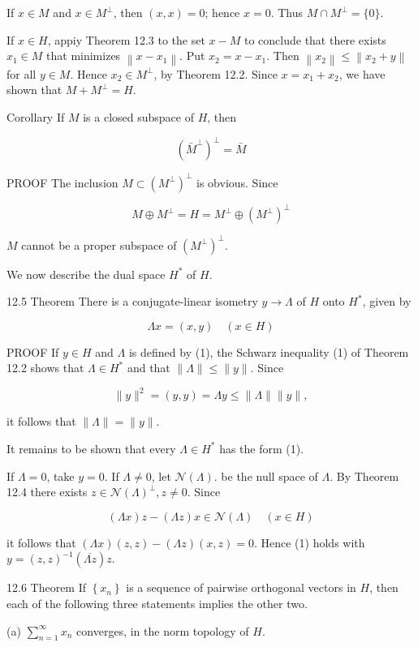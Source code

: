 \documentclass[10pt]{article}
\begin{document}
If $x \in M$ and $x \in M^{\perp}$, then $(x, x)=0$; hence $x=0$. Thus $M \cap M^{\perp}=\{0\}$.

If $x \in H$, appiy Theorem 12.3 to the set $x-M$ to conclude that there exists $x_{1} \in M$ that minimizes $\left\|x-x_{1}\right\|$. Put $x_{2}=x-x_{1}$. Then $\left\|x_{2}\right\| \leq\left\|x_{2}+y\right\|$ for all $y \in M$. Hence $x_{2} \in M^{\perp}$, by Theorem 12.2. Since $x=x_{1}+x_{2}$, we have shown that $M+M^{\perp}=H$.

Corollary If $M$ is a closed subspace of $H$, then

$$
\left(\bar{M}^{\perp}\right)^{\perp}=\bar{M}
$$

PROOF The inclusion $M \subset\left(M^{\perp}\right)^{\perp}$ is obvious. Since

$$
M \oplus M^{\perp}=H=M^{\perp} \oplus\left(M^{\perp}\right)^{\perp}
$$

$M$ cannot be a proper subspace of $\left(M^{\perp}\right)^{\perp}$.

We now describe the dual space $H^{*}$ of $H$.

12.5 Theorem There is a conjugate-linear isometry $y \rightarrow \Lambda$ of $H$ onto $H^{*}$, given by

$$
\Lambda x=(x, y) \quad(x \in H)
$$

PROOF If $y \in H$ and $\Lambda$ is defined by (1), the Schwarz inequality (1) of Theorem 12.2 shows that $\Lambda \in H^{*}$ and that $\|\Lambda\| \leq\|y\|$. Since

$$
\|y\|^{2}=(y, y)=\Lambda y \leq\|\Lambda\|\|y\|,
$$

it follows that $\|\Lambda\|=\|y\|$.

It remains to be shown that every $\Lambda \in H^{*}$ has the form (1).

If $\Lambda=0$, take $y=0$. If $\Lambda \neq 0$, let $\mathscr{N}(\Lambda)$. be the null space of $\Lambda$. By Theorem 12.4 there exists $z \in \mathscr{N}(\Lambda)^{\perp}, z \neq 0$. Since

$$
(\Lambda x) z-(\Lambda z) x \in \mathscr{N}(\Lambda) \quad(x \in H)
$$

it follows that $(\Lambda x)(z, z)-(\Lambda z)(x, z)=0$. Hence (1) holds with $y=(z, z)^{-1}(\overline{\Lambda z}) z$.

12.6 Theorem If $\left\{x_{n}\right\}$ is a sequence of pairwise orthogonal vectors in $H$, then each of the following three statements implies the other two.

(a) $\sum_{n=1}^{\infty} x_{n}$ converges, in the norm topology of $H$.
\end{document}
